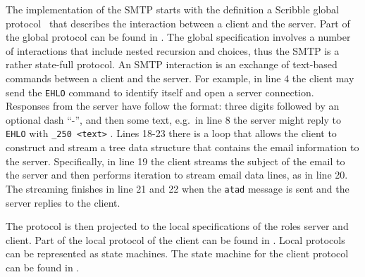 The implementation of the SMTP starts with
the definition a Scribble global protocol~\cite{HuR:smtp}
that describes the interaction between a client and the server.
Part of the global protocol can be found in
.
The global specification involves a number of interactions
that include nested recursion and choices, thus the SMTP
is a rather state-full protocol.
%
An SMTP interaction is an exchange of text-based {commands}
between a client and the server.
%
For example, in line 4 the client may send the
\lstinline|EHLO| command to identify itself and open a server connection.
Responses from the server have follow  the format:
three digits followed by an optional dash ``-'', and then some text,
e.g.~in line 8 the server might reply to \lstinline|EHLO| with \lstinline|_250 <text>| .
%
%
%
Lines 18-23 there is a loop that allows the client to construct
and stream a tree data structure that contains the email information
to the server. Specifically, in line 19 the client streams the subject of the
email to the server and then performs iteration to stream email data lines,
as in line 20. The streaming finishes in line 21 and 22 when the
\lstinline|atad| message is sent and the server replies to the client.

The protocol is then projected to the local specifications
of the roles server and client. Part of the local protocol
of the client can be found in .
Local protocols can be represented as state machines. The state
machine for the client protocol can be found in .


